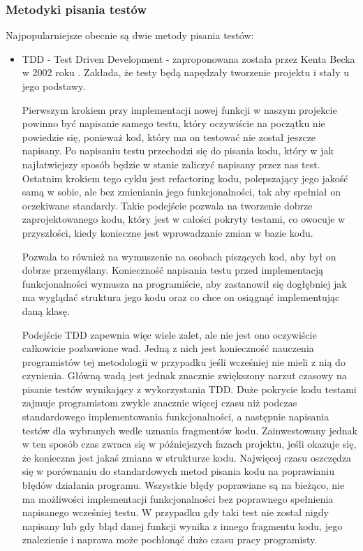 \subsubsection{Metodyki pisania testów}
\par Najpopularniejsze obecnie są dwie metody pisania testów: 
\begin{itemize}
    \item TDD - Test Driven Development - zaproponowana została przez Kenta Becka w 2002 roku \cite{TestDrivenDevelopment}. Zakłada, że testy będą napędzały tworzenie projektu i stały u jego podstawy. 
    \par Pierwszym krokiem przy implementacji nowej funkcji w naszym projekcie powinno być napisanie samego testu, który oczywiście na początku nie powiedzie się, ponieważ kod, który ma on testować nie został jeszcze napisany. Po napisaniu testu przechodzi się do pisania kodu, który w jak najłatwiejszy sposób będzie w stanie zaliczyć napisany przez nas test. Ostatnim krokiem tego cyklu jest refactoring kodu, polepszający jego jakość samą w sobie, ale bez zmieniania jego funkcjonalności, tak aby spełniał on oczekiwane standardy.
    Takie podejście pozwala na tworzenie dobrze zaprojektowanego kodu, który jest w całości pokryty testami, co owocuje w przyszłości, kiedy konieczne jest wprowadzanie zmian w bazie kodu.
    
    Pozwala to również na wymuszenie na osobach piszących kod, aby był on dobrze przemyślany. Konieczność napisania testu przed implementacją funkcjonalności wymusza na programiście, aby zastanowił się dogłębniej jak ma wyglądać struktura jego kodu oraz co chce on osiągnąć implementując daną klasę. 
    
    Podejście TDD zapewnia więc wiele zalet, ale nie jest ono oczywiście całkowicie pozbawione wad. Jedną z nich jest konieczność nauczenia programistów tej metodologii w przypadku jeśli wcześniej nie mieli z nią do czynienia. Główną wadą jest jednak znacznie zwiększony narzut czasowy na pisanie testów wynikający z wykorzystania TDD. Duże pokrycie kodu testami zajmuje programistom zwykle znacznie więcej czasu niż podczas standardowego implementowania funkcjonalności, a następnie napisania testów dla wybranych wedle uznania fragmentów kodu. Zainwestowany jednak w ten sposób czas zwraca się w późniejszych fazach projektu, jeśli okazuje się, że konieczna jest jakaś zmiana w strukturze kodu. Najwięcej czasu oszczędza się w porównaniu do standardowych metod pisania kodu na poprawianiu błędów działania programu. Wszystkie błędy poprawiane są na bieżąco, nie ma możliwości implementacji funkcjonalności bez poprawnego spełnienia napisanego wcześniej testu. W przypadku gdy taki test nie został nigdy napisany lub gdy błąd danej funkcji wynika z innego fragmentu kodu, jego znalezienie i naprawa może pochłonąć dużo czasu pracy programisty. 
    

\end{itemize}
